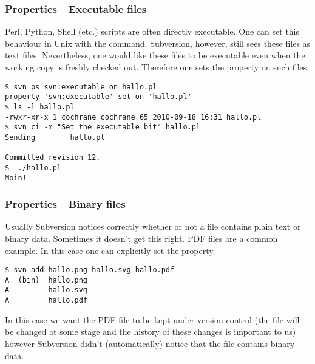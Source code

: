 \begin{frame}[fragile]
    \frametitle{Properties---Executable files}
    \linuxframe

    Perl, Python, Shell (etc.) scripts are often directly executable.
    One can set this behaviour in Unix with the  command.
    Subversion, however, still sees these files as text files.
    Nevertheless, one would like these files to be executable even when the
    working copy is freshly checked out.  Therefore one sets the
     property on such files.


\begin{lstlisting}
$ svn ps svn:executable on hallo.pl 
property 'svn:executable' set on 'hallo.pl'
$ ls -l hallo.pl 
-rwxr-xr-x 1 cochrane cochrane 65 2010-09-18 16:31 hallo.pl
$ svn ci -m "Set the executable bit" hallo.pl 
Sending        hallo.pl

Committed revision 12.
$  ./hallo.pl 
Moin!
\end{lstlisting}
\end{frame}

\begin{frame}[fragile]
    \frametitle{Properties---Binary files}
    \linuxframe

    Usually Subversion notices correctly whether or not a file contains
    plain text or binary data.  Sometimes it doesn't get this right.  PDF
    files are a common example.  In this case one can explicitly set the
     property.


\begin{lstlisting}
$ svn add hallo.png hallo.svg hallo.pdf
A  (bin)  hallo.png
A         hallo.svg
A         hallo.pdf
\end{lstlisting}

    In this case we want the PDF file to be kept under version control (the
    file will be changed at some stage and the history of these changes is
    important to us) however Subversion didn't (automatically) notice that
    the file contains binary data.
\end{frame}

